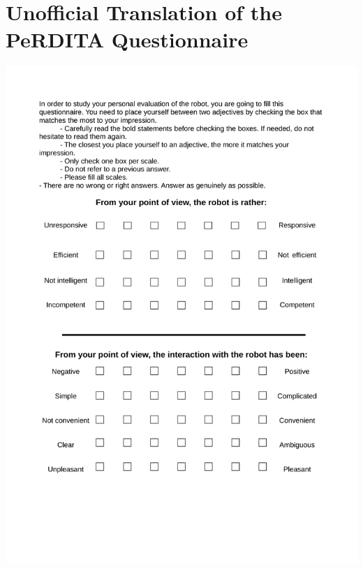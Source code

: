 \section[PeRDITA (Translated)]{Unofficial Translation of the PeRDITA Questionnaire}
\begin{center}
\includegraphics[page=1, width=\textwidth]{Annexes/perdita_translation_en_thesis.pdf} 
\end{center}

